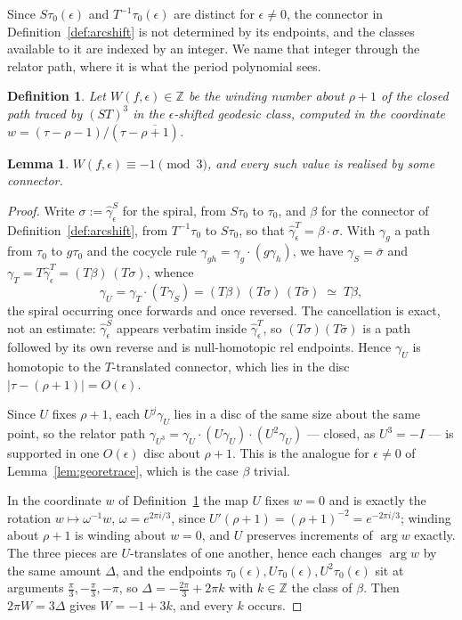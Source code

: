 \documentclass[11pt]{article}
\newtheorem{lemma}[theorem]{Lemma}
\newtheorem{definition}[theorem]{Definition}
\newcommand{\ZZ}{\mathbb{Z}}
\begin{document}
Since $S\tau_0(\epsilon)$ and $T^{-1}\tau_0(\epsilon)$ are distinct for $\epsilon\ne0$, the
connector in Definition~\ref{def:arcshift} is not determined by its endpoints, and the classes
available to it are indexed by an integer. We name that integer through the relator path, where it
is what the period polynomial sees.

\begin{definition}\label{def:arcwind}
Let $W(f,\epsilon)\in\ZZ$ be the winding number about $\rho+1$ of the closed path traced by
$(ST)^3$ in the $\epsilon$-shifted geodesic class, computed in the coordinate
$w=(\tau-\rho-1)/(\tau-\overline{\rho+1})$.
\end{definition}

\begin{lemma}\label{lem:windclass}
$W(f,\epsilon)\equiv-1\pmod3$, and every such value is realised by some connector.
\end{lemma}

\begin{proof}
Write $\sigma:=\hat\gamma^S_\epsilon$ for the spiral, from $S\tau_0$ to $\tau_0$, and $\beta$ for
the connector of Definition~\ref{def:arcshift}, from $T^{-1}\tau_0$ to $S\tau_0$, so that
$\hat\gamma^T_\epsilon=\beta\cdot\sigma$. With $\gamma_g$ a path from $\tau_0$ to $g\tau_0$ and
the cocycle rule $\gamma_{gh}=\gamma_g\cdot(g\gamma_h)$, we have $\gamma_S=\bar\sigma$ and
$\gamma_T=T\hat\gamma^T_\epsilon=(T\beta)\,(T\sigma)$, whence
\begin{equation}\label{eq:relatorcollapse}
\gamma_U=\gamma_T\cdot(T\gamma_S)=(T\beta)\,(T\sigma)\,(T\bar\sigma)\;\simeq\;T\beta ,
\end{equation}
the spiral occurring once forwards and once reversed. The cancellation is exact, not an estimate:
$\hat\gamma^S_\epsilon$ appears verbatim inside $\hat\gamma^T_\epsilon$, so
$(T\sigma)(T\bar\sigma)$ is a path followed by its own reverse and is null-homotopic rel
endpoints. Hence $\gamma_U$ is homotopic to the $T$-translated connector, which lies in the disc
$|\tau-(\rho+1)|=O(\epsilon)$.

Since $U$ fixes $\rho+1$, each $U^j\gamma_U$ lies in a disc of the same size about the same
point, so the relator path $\gamma_{U^3}=\gamma_U\cdot(U\gamma_U)\cdot(U^2\gamma_U)$ --- closed,
as $U^3=-I$ --- is supported in one $O(\epsilon)$ disc about $\rho+1$. This is the analogue for
$\epsilon\ne0$ of Lemma~\ref{lem:georetrace}, which is the case $\beta$ trivial.

In the coordinate $w$ of Definition~\ref{def:arcwind} the map $U$ fixes $w=0$ and is exactly the
rotation $w\mapsto\omega^{-1}w$, $\omega=e^{2\pi i/3}$, since $U'(\rho+1)=(\rho+1)^{-2}
=e^{-2\pi i/3}$; winding about $\rho+1$ is winding about $w=0$, and $U$ preserves increments of
$\arg w$ exactly. The three pieces are $U$-translates of one another, hence each changes
$\arg w$ by the same amount $\Delta$, and the endpoints
$\tau_0(\epsilon),U\tau_0(\epsilon),U^2\tau_0(\epsilon)$ sit at arguments
$\tfrac{\pi}{3},-\tfrac{\pi}{3},-\pi$, so $\Delta=-\tfrac{2\pi}{3}+2\pi k$ with $k\in\ZZ$ the
class of $\beta$. Then $2\pi W=3\Delta$ gives $W=-1+3k$, and every $k$ occurs.
\end{proof}
\end{document}
